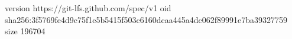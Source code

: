version https://git-lfs.github.com/spec/v1
oid sha256:3f5769fe4d9c75f1e5b5415f503c6160dcaa445a4dc062f89991e7ba39327759
size 196704
